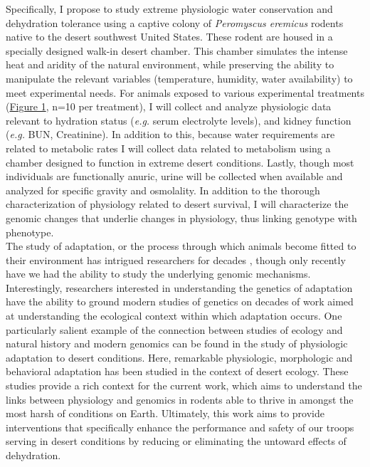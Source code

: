 \documentclass[12pt]{article}
\begin{document}
Specifically, I propose to study extreme physiologic water conservation and dehydration tolerance using a captive colony of \textit{Peromyscus eremicus} rodents native to the desert southwest United States. These rodent are housed in a specially designed walk-in desert chamber. This chamber simulates the intense heat and aridity of the natural environment, while preserving the ability to manipulate the relevant variables (temperature, humidity, water availability) to meet experimental needs. For animals exposed to various experimental treatments (\hyperlink{Figure 1}{Figure 1}, n=10 per treatment), I will collect and analyze physiologic data relevant to hydration status (\textit{e.g.} serum electrolyte levels), and kidney function (\textit{e.g.} BUN, Creatinine). In addition to this, because water requirements are related to metabolic rates I will collect data related to metabolism using a chamber designed to function in extreme desert conditions. Lastly, though most individuals are functionally anuric, urine will be collected when available and analyzed for specific gravity and osmolality. In addition to the thorough characterization of physiology related to desert survival, I will characterize the genomic changes that underlie changes in physiology, thus linking genotype with phenotype. \\

The study of adaptation, or the process through which animals become fitted to their environment has intrigued researchers for decades \citep{Darwin:1859tm, Fisher:1930wy}, though only recently have we had the ability to study the underlying genomic mechanisms. Interestingly, researchers interested in understanding the genetics of adaptation have the ability to ground modern studies of genetics on decades of work aimed at understanding the ecological context within which adaptation occurs. One particularly salient example of the connection between studies of ecology and natural history and modern genomics can be found in the study of physiologic adaptation to desert conditions. Here, remarkable physiologic, morphologic \citep{Dickinson:2007jn,Huntley:1984us,SchmidtNielsen:1950wg,SchmidtNielsen:1952wp} and behavioral \citep{NAGY:1994vd} adaptation has been studied in the context of desert ecology. These studies provide a rich context for the current work, which aims to understand the links between physiology and genomics in rodents able to thrive in amongst the most harsh of conditions on Earth. Ultimately, this work aims to provide interventions that specifically enhance the performance and safety of our troops serving in desert conditions by reducing or eliminating the untoward effects of dehydration.\\
\end{document}
